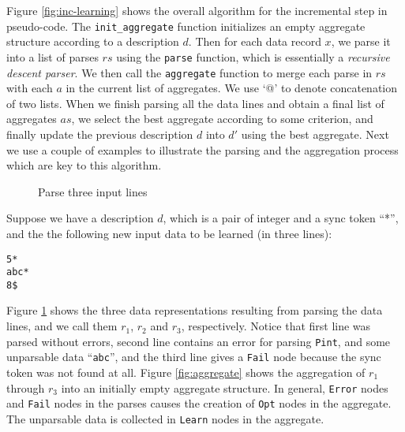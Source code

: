 Figure \ref{fig:inc-learning} shows the overall algorithm for the incremental step in
pseudo-code. The {\tt init\_aggregate} function initializes an empty aggregate
structure according to a description $d$.  
Then for each data record $x$, we parse it into a list of parses $rs$
using the {\tt parse} function, which is essentially a {\em recursive descent parser}. 
We then call the {\tt aggregate} function to merge
each parse in $rs$ with each $a$ in the current list of aggregates. We use `@' to denote
concatenation of two lists. When we finish
parsing all the data lines and obtain a final list of aggregates $as$, we select
the best aggregate according to some criterion, and finally update the previous description
$d$ into $d'$ using the best aggregate. Next we use a couple of examples to
illustrate the parsing and the aggregation process which are key to this algorithm.

\begin{figure}[t]
\begin{center}
\caption{Parse three input lines}\label{fig:parse}
\end{center}
\end{figure}

\begin{figure*}[t]
\begin{center}
\caption{Aggregate three parses into final aggregate structure}\label{fig:aggregate}
\end{center}
\end{figure*}

Suppose we have a description $d$, which is a pair of integer and a sync token ``*'',
and the the following new input data to be learned (in three lines):
{\small
\begin{verbatim}
5*
abc*
8$
\end{verbatim}
}

Figure \ref{fig:parse} shows the three data representations resulting from parsing the data lines,
and we call them $r_1$, $r_2$ and $r_3$, respectively. Notice that first line was parsed
without errors, second line contains an error for parsing {\tt Pint}, and some unparsable data
``{\tt abc}'', and the third line gives a {\tt Fail} node because the sync token was not found
at all. 
Figure \ref{fig:aggregate} shows the aggregation of $r_1$ through $r_3$ into an initially empty
aggregate structure. In general, {\tt Error} nodes and {\tt Fail} nodes in the parses causes the
creation of {\tt Opt} nodes in the aggregate. The unparsable data is collected in {\tt Learn} nodes
in the aggregate. 

